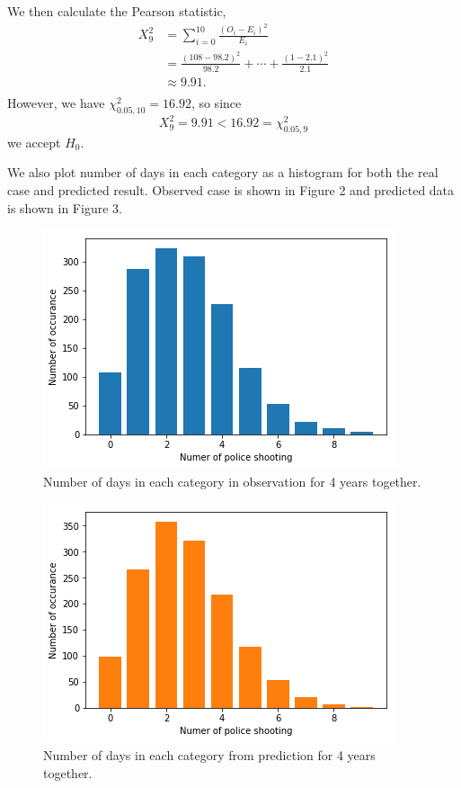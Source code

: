 \documentclass[11pt,a4paper,english]{article}
\begin{document}
We then calculate the Pearson statistic,
\[
	\begin{aligned}
		X_{9}^{2} &= \sum_{i = 0}^{10}\frac{(O_{i}-E_{i})^{2}}{E_{i}}\\
		&= \frac{(108-98.2)^{2}}{98.2}+\cdots+\frac{(1-2.1)^{2}}{2.1}\\
		&\approx 9.91.\\
	\end{aligned}
\] 
However, we have $\chi^{2}_{0.05,10} = 16.92$, so since 
\[X_{9}^{2} = 9.91 < 16.92 = \chi_{0.05,9}^{2}\]
we accept $H_{0}$.

We also plot number of days in each category as a histogram for both the real case and predicted result. Observed case is shown in Figure 2 and predicted data is shown in Figure 3.
\begin{figure}[htbp]
	\centering
	\includegraphics[width = \textwidth]{4-years.png}
	\caption{Number of days in each category in observation for 4 years together.}
\end{figure}
\begin{figure}[htbp]
	\centering
	\includegraphics[width = \textwidth]{poisson.png}
	\caption{Number of days in each category from prediction for 4 years together.}
\end{figure}
\end{document}
